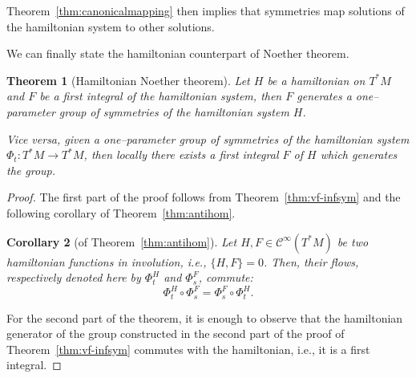 \documentclass[english,fontsize=11pt,paper=b5]{scrbook}
\newtheorem{theorem}{Theorem}[chapter]
\newtheorem{corollary}[theorem]{Corollary}
\theoremstyle{definition}
\begin{document}
    Theorem~\ref{thm:canonicalmapping} then implies that symmetries map solutions of the hamiltonian system to other solutions.

    We can finally state the hamiltonian counterpart of Noether theorem.

    \begin{theorem}[Hamiltonian Noether theorem]
      Let $H$ be a hamiltonian on $T^*M$ and $F$ be a first integral of the hamiltonian system, then $F$ generates a one--parameter group of symmetries of the hamiltonian system $H$.

      Vice versa, given a one--parameter group of symmetries of the hamiltonian system $\Phi_t:T^*M\to T^* M$, then \emph{locally} there exists a first integral $F$ of $H$ which generates the group.
    \end{theorem}
    \begin{proof}
      The first part of the proof follows from Theorem~\ref{thm:vf-infsym} and the following corollary of Theorem~\ref{thm:antihom}.

      \begin{corollary}[of Theorem~\ref{thm:antihom}]
        Let $H, F \in \mathcal{C}^\infty(T^*M)$ be two hamiltonian functions in involution, i.e., $\{H,F\}=0$.
        Then, their flows, respectively denoted here by $\Phi_t^H$ and $\Phi_s^F$, commute:
        \begin{equation}
          \Phi_t^H \circ \Phi_s^F = \Phi_s^F \circ \Phi_t^H.
        \end{equation}
      \end{corollary}

      For the second part of the theorem, it is enough to observe that the hamiltonian generator of the group constructed in the second part of the proof of Theorem~\ref{thm:vf-infsym} commutes with the hamiltonian, i.e., it is a first integral.
    \end{proof}
\end{document}

